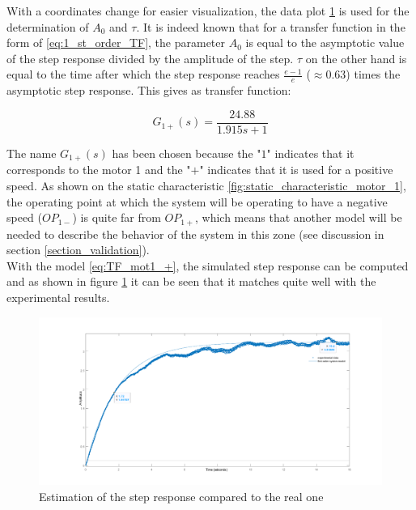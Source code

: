 With a coordinates change for easier visualization, the data plot \ref{fig:estimated_step_response_positive_motor_1} is 
used for the determination of $A_0$ and $\tau$. It is indeed known that for a transfer function in the form of 
\ref{eq:1_st_order_TF}, the parameter $A_0$ is equal to the asymptotic value of the step response divided by the amplitude 
of the step. $\tau$ on the other hand is equal to the time after which the step response reaches $\frac{e-1}{e}$ ($\approx 0.63$)
times the asymptotic step response. This gives as transfer function:

\begin{equation}
    G_{1+}(s) = \frac{24.88}{1.915s + 1}
    \label{eq:TF_mot1_+}
\end{equation}

The name $G_{1+}(s)$ has been chosen because the "\textit{$1$}" indicates that it corresponds to the motor 1 and the 
"\textit{$+$}" indicates that it is used for a positive speed. As shown on the static characteristic 
\ref{fig:static_characteristic_motor_1}, the operating point at which the system will be operating to have a negative speed 
($OP_{1-}$) is quite far from $OP_{1+}$, which means that another model will be needed to describe the behavior of the 
system in this zone (see discussion in section \ref{section_validation}).\\

With the model \ref{eq:TF_mot1_+}, the simulated step response can be computed and as shown in figure 
\ref{fig:estimated_step_response_positive_motor_1} it can be seen that it matches quite well with the experimental results.

\begin{figure}[H]
    \centering
    \includegraphics[height=\textheight/3]{Pictures/first_order_model_positive_motor_1.png}
    \caption{Estimation of the step response compared to the real one}
    \label{fig:estimated_step_response_positive_motor_1}
\end{figure}

